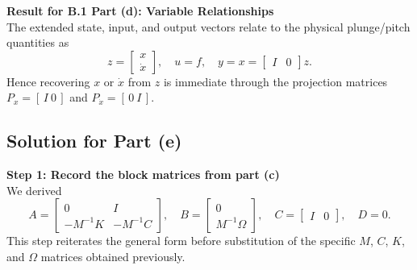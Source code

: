 \documentclass[12pt]{article}
\begin{document}
\begin{resultsbox}
\textbf{Result for B.1 Part (d): Variable Relationships}\\[0.5em]
The extended state, input, and output vectors relate to the physical plunge/pitch quantities as
\[
z = \begin{bmatrix} x \\ \dot{x} \end{bmatrix}, \quad u = f, \quad y = x = \begin{bmatrix} I & 0 \end{bmatrix} z.
\]
Hence recovering $x$ or $\dot{x}$ from $z$ is immediate through the projection matrices $P_x = [\,I \ 0\,]$ and $P_{\dot{x}} = [\,0 \ I\,]$.
\end{resultsbox}

\clearpage
\subsection*{Solution for Part (e)}

\begin{stepbox}
\textbf{Step 1: Record the block matrices from part (c)}\\[0.5em]
We derived
\[
A = \begin{bmatrix}
0 & I \\
-M^{-1}K & -M^{-1}C
\end{bmatrix}, \quad
B = \begin{bmatrix}
0 \\
M^{-1}\Omega
\end{bmatrix}, \quad
C = \begin{bmatrix}
I & 0
\end{bmatrix}, \quad
D = 0.
\]
This step reiterates the general form before substitution of the specific $M$, $C$, $K$, and $\Omega$ matrices obtained previously.
\end{stepbox}
\end{document}
